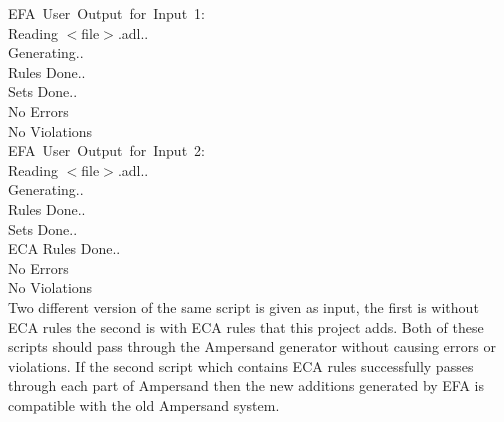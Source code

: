 \documentclass[12pt]{report}
\begin{document}
	
EFA\ User\ Output\ for\ Input\ 1: \\
	Reading $<$file$>$.adl.. \\
	Generating.. \\
	Rules Done.. \\
	Sets Done.. \\
	No Errors \\
	No Violations \\
	EFA\ User\ Output\ for\ Input\ 2: \\
	Reading $<$file$>$.adl..\\
	Generating.. \\
	Rules Done.. \\
	Sets Done.. \\
	ECA Rules Done.. \\
	No Errors \\
	No Violations \\
	
Two different version of the same script is given as input, the first is 
without ECA rules the second is with ECA rules that this project adds. Both of 
these scripts should pass through the Ampersand generator without causing 
errors or violations. If the second script which contains ECA rules 
successfully passes through each part of Ampersand then the new additions 
generated by EFA is compatible with the old Ampersand system.







\end{document}
